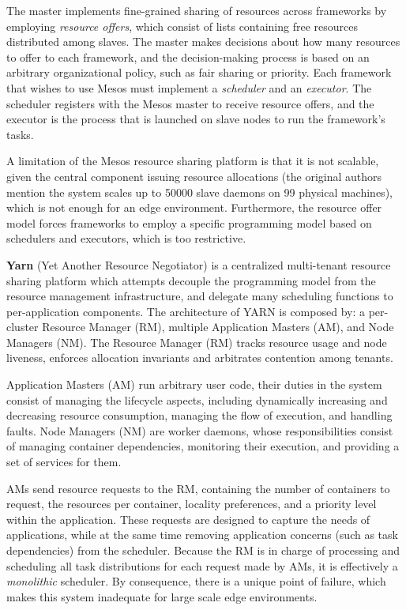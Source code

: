 The master implements fine-grained sharing of resources across frameworks by employing \textit{resource offers}, which consist of lists containing free resources distributed among slaves. The master makes decisions about how many resources to offer to each framework, and the decision-making process is based on an arbitrary organizational policy, such as fair sharing or priority. Each framework that wishes to use Mesos must implement a \textit{scheduler} and an \textit{executor}. The scheduler registers with the Mesos master to receive resource offers, and the executor is the process that is launched on slave nodes to run the framework's tasks.

A limitation of the Mesos resource sharing platform is that it is not scalable, given the central component issuing resource allocations (the original authors mention the system scales up to 50000 slave daemons on 99 physical machines), which is not enough for an edge environment. Furthermore, the resource offer model forces frameworks to employ a specific programming model based on schedulers and executors, which is too restrictive.

\textbf{Yarn} (Yet Another Resource Negotiator) \cite{Vavilapalli2013ApacheHY} is a centralized multi-tenant resource sharing platform which attempts decouple the programming model from the resource management infrastructure, and delegate many scheduling functions to per-application components. The architecture of YARN is composed by: a per-cluster Resource Manager (RM), multiple Application Masters (AM), and Node Managers (NM). The Resource Manager (RM) tracks resource usage and node liveness, enforces allocation invariants and arbitrates contention among tenants.

Application Masters (AM) run arbitrary user code, their duties in the system consist of managing the lifecycle aspects, including dynamically increasing and decreasing resource consumption, managing the flow of execution, and handling faults. Node Managers (NM) are worker daemons, whose responsibilities consist of managing container dependencies, monitoring their execution, and providing a set of services for them.

AMs send resource requests to the RM, containing the number of containers to request, the resources per container, locality preferences, and a priority level within the application. These requests are designed to capture the needs of applications, while at the same time removing application concerns (such as task dependencies) from the scheduler. Because the RM is in charge of processing and scheduling all task distributions for each request made by AMs, it is effectively a \textit{monolithic} scheduler. By consequence, there is a unique point of failure, which makes this system inadequate for large scale edge environments.

